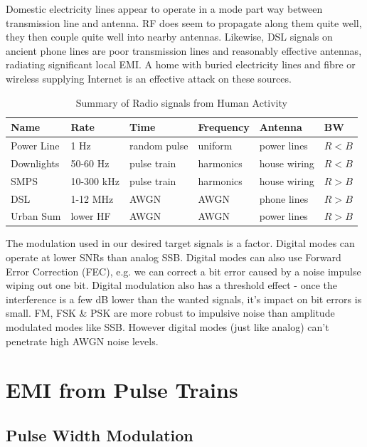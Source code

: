 \documentclass{article}
\begin{document}
Domestic electricity lines appear to operate in a mode part way between transmission line and antenna.  RF does seem to propagate along them quite well, they then couple quite well into nearby antennas.  Likewise, DSL signals on ancient phone lines are poor transmission lines and reasonably effective antennas, radiating significant local EMI. A home with buried electricity lines and fibre or wireless supplying Internet is an effective attack on these sources.

\begin{table}[h]
\centering
\begin{tabular}{l l l l l l}
 \hline
 Name & Rate & Time & Frequency & Antenna & BW \\
 \hline
 Power Line & 1 Hz & random pulse & uniform & power lines & $R < B$ \\
 Downlights & 50-60 Hz & pulse train & harmonics & house wiring & $R < B$ \\
 SMPS & 10-300 kHz & pulse train & harmonics & house wiring & $R > B$ \\
 DSL & 1-12 MHz & AWGN & AWGN & phone lines & $R > B$ \\
 Urban Sum & lower HF & AWGN & AWGN & power lines & $R > B$ \\
 \hline
\end{tabular}
\caption{Summary of Radio signals from Human Activity}
\label{table:human_noise}
\end{table}

The modulation used in our desired target signals is a factor.  Digital modes can operate at lower SNRs than analog SSB.  Digital modes can also use Forward Error Correction (FEC), e.g. we can correct a bit error caused by a noise impulse wiping out one bit.  Digital modulation also has a threshold effect - once the interference is a few dB lower than the wanted signals, it's impact on bit errors is small. FM, FSK \& PSK are more robust to impulsive noise than amplitude modulated modes like SSB.  However digital modes (just like analog) can't penetrate high AWGN noise levels.

\section{EMI from Pulse Trains}
\label{pwm}

\subsection{Pulse Width Modulation}
\label{smps}
\end{document}

